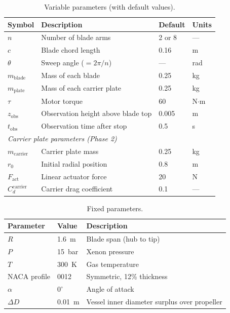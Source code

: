 \documentclass[11pt,a4paper]{article}
\begin{document}
\begin{table}[H]
\centering
\caption{Variable parameters (with default values).}
\label{tab:params}
\begin{tabular}{llll}
\toprule
Symbol & Description & Default & Units \\
\midrule
$n$                   & Number of blade arms            & 2 or 8 & --- \\
$c$                   & Blade chord length              & 0.16  & m   \\
$\theta$              & Sweep angle ($= 2\pi/n$)        & ---   & rad \\
$m_\mathrm{blade}$   & Mass of each blade              & 0.25  & kg  \\
$m_\mathrm{plate}$   & Mass of each carrier plate      & 0.25  & kg \\
$\tau$               & Motor torque                     & 60    & N$\cdot$m \\
$z_\mathrm{obs}$     & Observation height above blade top & 0.005 & m \\
$t_\mathrm{obs}$     & Observation time after stop      & 0.5   & s   \\
\midrule
\multicolumn{4}{l}{\textit{Carrier plate parameters (Phase 2)}} \\
$m_\mathrm{carrier}$ & Carrier plate mass               & 0.25  & kg  \\
$r_0$                & Initial radial position          & 0.8   & m   \\
$F_\mathrm{act}$     & Linear actuator force            & 20    & N   \\
$C_d^\mathrm{carrier}$ & Carrier drag coefficient       & 0.1   & --- \\
\bottomrule
\end{tabular}
\end{table}

\begin{table}[H]
\centering
\caption{Fixed parameters.}
\label{tab:fixed}
\begin{tabular}{lll}
\toprule
Parameter & Value & Description \\
\midrule
$R$            & \SI{1.6}{m}        & Blade span (hub to tip) \\
$P$            & \SI{15}{bar}       & Xenon pressure \\
$T$            & \SI{300}{K}        & Gas temperature \\
NACA profile   & 0012               & Symmetric, 12\% thickness \\
$\alpha$       & $0^\circ$          & Angle of attack \\
$\Delta D$     & \SI{0.01}{m}       & Vessel inner diameter surplus over propeller \\
\bottomrule
\end{tabular}
\end{table}
\end{document}
